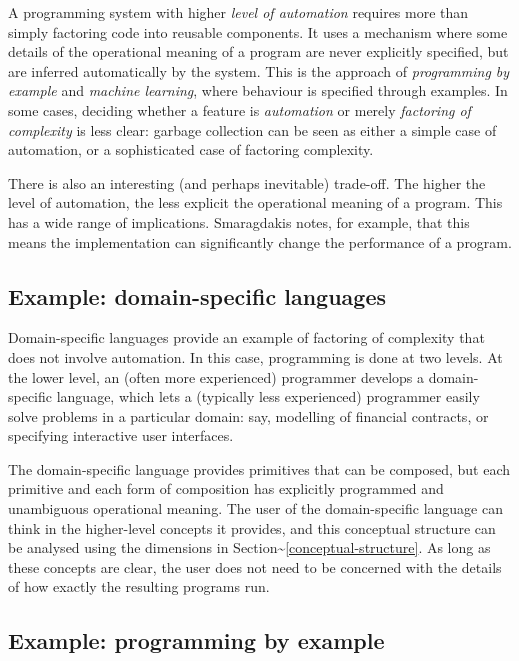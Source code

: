 \documentclass[ twoside,openright,titlepage,numbers=noenddot,headinclude,footinclude,cleardoublepage=empty,abstract=on,
                BCOR=5mm,paper=a4,fontsize=11pt
                ]{scrreprt}
\theoremstyle{definition}
\begin{document}
A programming system with higher \emph{level of automation} requires
more than simply factoring code into reusable components. It uses a
mechanism where some details of the operational meaning of a program are
never explicitly specified, but are inferred automatically by the
system. This is the approach of \emph{programming by example} and
\emph{machine learning}, where behaviour is specified through examples.
In some cases, deciding whether a feature is \emph{automation} or merely
\emph{factoring of complexity} is less clear: garbage collection can be
seen as either a simple case of automation, or a sophisticated case of
factoring complexity.

There is also an interesting (and perhaps inevitable) trade-off. The
higher the level of automation, the less explicit the operational
meaning of a program. This has a wide range of implications. Smaragdakis
\parencite{NextGen} notes, for example, that this means the
implementation can significantly change the performance of a program.

\hypertarget{example-domain-specific-languages}{\subsection{Example: domain-specific
languages}\label{example-domain-specific-languages}}

Domain-specific languages \parencite{DSLs} provide an example of
factoring of complexity that does not involve automation. In this case,
programming is done at two levels. At the lower level, an (often more
experienced) programmer develops a domain-specific language, which lets
a (typically less experienced) programmer easily solve problems in a
particular domain: say, modelling of financial contracts, or specifying
interactive user interfaces.

The domain-specific language provides primitives that can be composed,
but each primitive and each form of composition has explicitly
programmed and unambiguous operational meaning. The user of the
domain-specific language can think in the higher-level concepts it
provides, and this conceptual structure can be analysed using the
dimensions in Section\textasciitilde{}\ref{conceptual-structure}. As
long as these concepts are clear, the user does not need to be concerned
with the details of how exactly the resulting programs run.

\hypertarget{example-programming-by-example}{\subsection{Example: programming by
example}\label{example-programming-by-example}}
\end{document}
